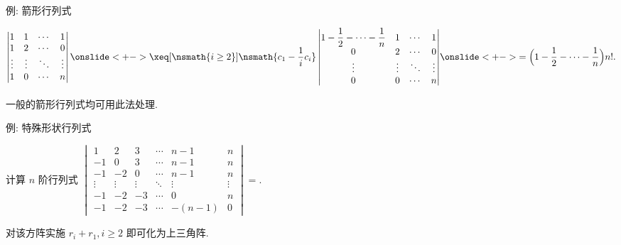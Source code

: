 \begin{frame}{例: 箭形行列式}
	\onslide<+->
	\begin{example}
		\[\begin{vmatrix}
			1&1&\cdots&1\\
			1&2&\cdots&0\\
			\vdots&\vdots&\ddots&\vdots\\
			1&0&\cdots&n
		\end{vmatrix}\onslide<+->{\xeq[\nsmath{i\ge 2}]{\nsmath{c_1-\dfrac1i c_i}}
		\begin{vmatrix}
			1-\dfrac12-\cdots-\dfrac1n&1&\cdots&1\\
			0&2&\cdots&0\\
			\vdots&\vdots&\ddots&\vdots\\
			0&0&\cdots&n
		\end{vmatrix}}
		\onslide<+->{=\Bigl(1-\frac12-\cdots-\frac1n\Bigr)n!.}\]
	\end{example}
	\onslide<+->
	一般的箭形行列式均可用此法处理.
\end{frame}


\begin{frame}{例: 特殊形状行列式}\small
	\beqskip{0pt}
	\onslide<+->
	\begin{exercise}
		计算 $n$ 阶行列式 $\begin{vmatrix}
			1&2&3&\cdots&n-1&n\\
			-1&0&3&\cdots&n-1&n\\
			-1&-2&0&\cdots&n-1&n\\
			\vdots&\vdots&\vdots&\ddots&\vdots&\vdots\\
			-1&-2&-3&\cdots&0&n\\
			-1&-2&-3&\cdots&-(n-1)&0
		\end{vmatrix}=$.
	\end{exercise}
	\onslide<+->
	\begin{answer}
		对该方阵实施 $r_i+r_1,i\ge 2$ 即可化为上三角阵.
	\end{answer}
	\endgroup
\end{frame}



